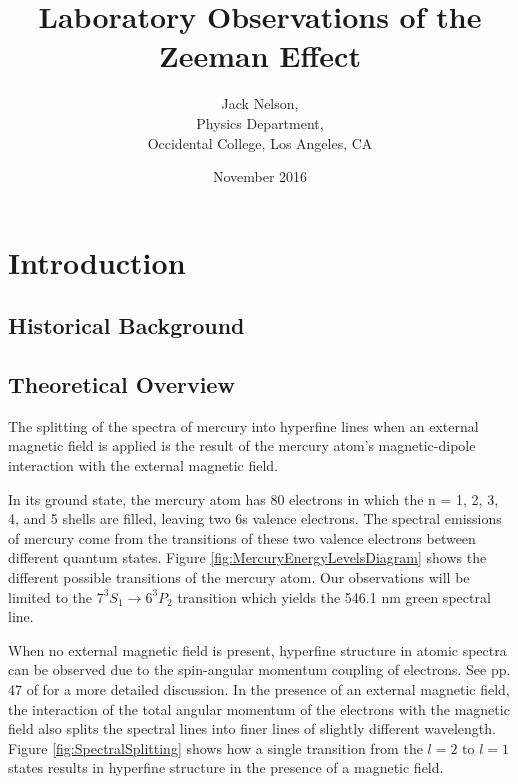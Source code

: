 \documentclass[twocolumn]{article}
\title{Laboratory Observations of the Zeeman Effect}
\author{Jack Nelson,\\
	Physics Department,\\
	Occidental College, Los Angeles, CA}
\date{November 2016}
\begin{document}
\maketitle

\begin{abstract}
	
\end{abstract}

\section{Introduction} \label{sec:Intro}
	\subsection{Historical Background}

	\subsection{Theoretical Overview} \label{sec:Theory}
		The splitting of the spectra of mercury into hyperfine lines when an external magnetic field is applied is the result of the mercury atom's magnetic-dipole interaction with the external magnetic field.
		 
		In its ground state, the mercury atom has 80 electrons in which the n = 1, 2, 3, 4, and 5 shells are filled, leaving two 6s valence electrons.
		The spectral emissions of mercury come from the transitions of these two valence electrons between different quantum states.
		Figure \ref{fig:MercuryEnergyLevelsDiagram} shows the different possible transitions of the mercury atom.
		Our observations will be limited to the $7^3S_1 \rightarrow 6^3P_2$ transition which yields the 546.1 nm green spectral line.
		
		When no external magnetic field is present, hyperfine structure in atomic spectra can be observed due to the spin-angular momentum coupling of electrons. 
		See pp. 47 of \cite{melissinos_experiments_1966} for a more detailed discussion.
		In the presence of an external magnetic field, the interaction of the total angular momentum of the electrons with the magnetic field also splits the spectral lines into finer lines of slightly different wavelength.
		Figure \ref{fig:SpectralSplitting} shows how a single transition from the $l=2$ to $l=1$ states results in hyperfine structure in the presence of a magnetic field.
		
\end{document}
